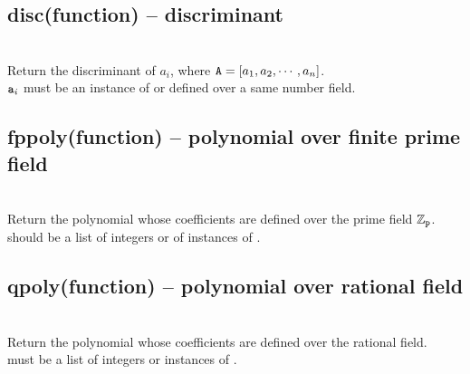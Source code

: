   \subsection{disc(function) -- discriminant}
   \\
  \spacing
  \quad Return the discriminant of $a_i$, where ${\texttt A} = [a_1, a_2, \cdots, a_n]$. \\
  \spacing
  ${\texttt a_i}$ must be an instance of  or  defined over a same number field.\\
%
  \subsection{fppoly(function) -- polynomial over finite prime field}
   \\
  \spacing
  \quad Return the polynomial whose coefficients  are defined over the prime field $\mathbb{Z}_{\texttt p}$. \\
  \spacing
  \quad {} should be a list of integers or of instances of .\\
%
%
  \subsection{qpoly(function) -- polynomial over rational field}
   \\
  \spacing
  \quad Return the polynomial whose coefficients  are defined over the rational field. \\
  \spacing
  \quad {} must be a list of integers or instances of .\\
%

